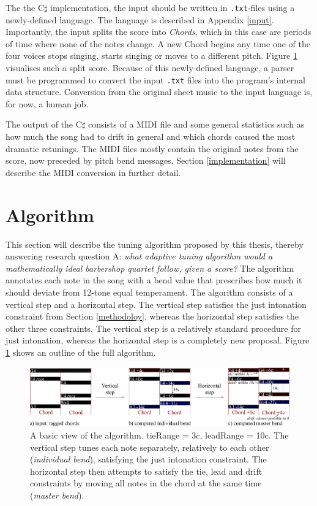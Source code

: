 \documentclass[a4paper]{article}
\begin{document}
The the C$\sharp$ implementation, the input should be written in \texttt{.txt}-files using a newly-defined language. The language is described in Appendix \ref{input}. Importantly, the input splits the score into \textit{Chords}, which in this case are periods of time where none of the notes change. A new Chord begins any time one of the four voices stops singing, starts singing or moves to a different pitch. Figure \ref{fig:algo_outline} visualises such a split score. Because of this newly-defined language, a parser must be programmed to convert the input \texttt{.txt} files into the program's internal data structure. Conversion from the original sheet music to the input language is, for now, a human job.

The output of the C$\sharp$ consists of a MIDI file \cite{midi_manufacturers_association_complete_2014} and some general statistics such as how much the song had to drift in general and which chords caused the most dramatic retunings. The MIDI files mostly contain the original notes from the score, now preceded by pitch bend messages. Section \ref{implementation} will describe the MIDI conversion in further detail.


\section{Algorithm}
\label{algorithm}
This section will describe the tuning algorithm proposed by this thesis, thereby answering research question A: {\it what adaptive tuning algorithm would a mathematically ideal barbershop quartet follow, given a score?} The algorithm annotates each note in the song with a bend value that prescribes how much it should deviate from 12-tone equal temperament. The algorithm consists of a vertical step and a horizontal step. The vertical step satisfies the just intonation constraint from Section \ref{methodoloy}, whereas the horizontal step satisfies the other three constraints. The vertical step is a relatively standard procedure for just intonation, whereas the horizontal step is a completely new proposal. Figure \ref{fig:algo_outline} shows an outline of the full algorithm.

\begin{figure}
	\includegraphics[width=\linewidth]{Figures/algo_outline.pdf}
	\caption{A basic view of the algorithm. tieRange = 3c, leadRange = 10c. The vertical step tunes each note separately, relatively to each other (\textit{individual bend}), satisfying the just intonation constraint. The horizontal step then attempts to satisfy the tie, lead and drift constraints by moving all notes in the chord at the same time (\textit{master bend}).}
	\label{fig:algo_outline}
\end{figure}
\end{document}
